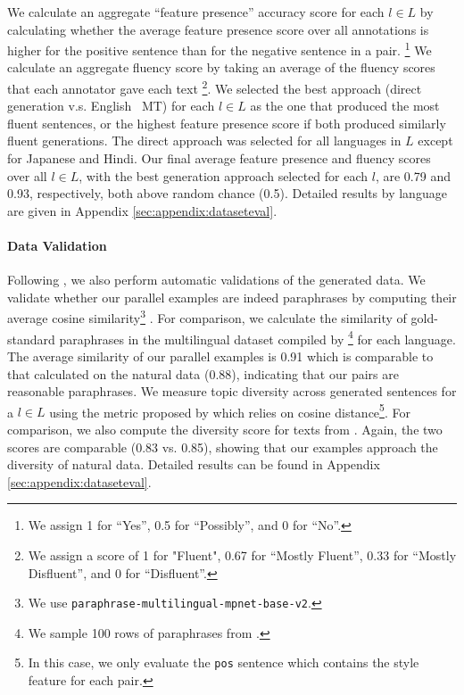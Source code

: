 We calculate an aggregate ``feature presence'' accuracy score for each $l \in L$ by calculating whether the average feature presence score over all annotations is higher for the positive sentence than for the negative sentence in a pair. \footnote{We assign 1 for ``Yes'', 0.5 for ``Possibly'', and 0 for ``No''.} %
We calculate an aggregate fluency score by taking an average of the fluency scores that each annotator gave each text \footnote{ We assign a score of 1 for "Fluent", 0.67 for ``Mostly Fluent'', 0.33 for ``Mostly Disfluent'', and 0 for ``Disfluent''.}. We selected the best approach (direct generation v.s. English \textrightarrow ~MT) for each $l \in L$ as the one that produced the most fluent sentences, or the highest feature presence score if both produced similarly fluent generations. The direct approach was selected for all languages in $L$ except for Japanese and Hindi. Our final average feature presence and fluency scores over all $l \in L$, with the best generation approach selected for each $l$, are 0.79 and 0.93, respectively, both above random chance (0.5). Detailed results by language are given in Appendix \ref{sec:appendix:dataseteval}. 

\paragraph{Data Validation} Following \citet{patel2024styledistancestrongercontentindependentstyle}, we also perform automatic validations of the generated data. We validate whether our parallel examples are indeed paraphrases by computing their average cosine similarity\footnote{We use \texttt{\small paraphrase-multilingual-mpnet-base-v2}.} \cite{sentencetransformers}. For comparison, we calculate the similarity of gold-standard paraphrases in the multilingual dataset compiled by \citet{scherrer-2020-tapaco} \footnote{We sample 100 rows of paraphrases from \citet{scherrer-2020-tapaco}.} for each language. The average similarity of our parallel examples is 0.91 which is comparable to that calculated on the \citet{scherrer-2020-tapaco} natural data (0.88), indicating that our pairs are reasonable paraphrases. We measure topic diversity across generated sentences for a $l \in L$ using the metric proposed by \citet{diversityscore} which relies on cosine distance\footnote{In this case, we only evaluate the {\tt pos} sentence which contains the style feature for each pair.}. For comparison, we also compute the diversity score for texts from \citet{scherrer-2020-tapaco}. Again, the two scores are comparable (0.83 vs. 0.85), showing that our examples approach the diversity of natural data. Detailed results can be found in Appendix \ref{sec:appendix:dataseteval}.
